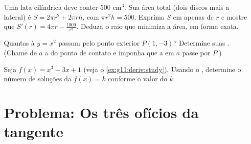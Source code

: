 \begin{exercise}[$\star\star$]\label{exo:g11:deriv:10}
Uma lata cilíndrica deve conter $500$ cm$^3$. Sua área total (dois discos
mais a lateral) é $S = 2\pi r^2 + 2\pi r h$, com $\pi r^2 h = 500$.
Exprima $S$ em  apenas de $r$ e mostre que
$S'(r) = 4\pi r - \frac{1000}{r^2}$. Deduza o raio que minimiza a área,
em forma exata.
\end{exercise}

\begin{exercise}[$\star\star\star$]\label{exo:g11:deriv:11}
Quantas  à  $y = x^2$ passam pelo ponto exterior
$P(1, -3)$? Determine suas . (Chame de $a$ a  do ponto de
contato e imponha que a  em $a$ passe por $P$.)
\end{exercise}

\begin{exercise}[$\star\star\star$]\label{exo:g11:deriv:12}
Seja $f(x) = x^3 - 3x + 1$ (veja o \cref{ex:g11:deriv:study}). Usando o
, determine o número de soluções da 
$f(x) = k$ conforme o valor do  $k$.
\end{exercise}

\section{Problema: Os três ofícios da tangente}

